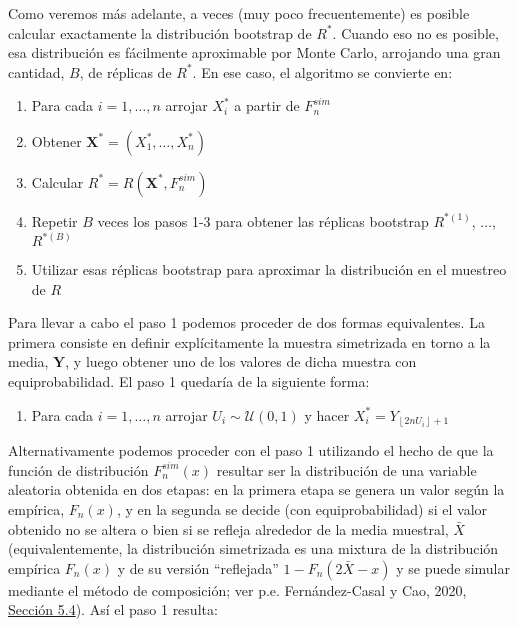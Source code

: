 \documentclass[
]{book}
\providecommand{\tightlist}{%
  \setlength{\itemsep}{0pt}\setlength{\parskip}{0pt}}
\theoremstyle{break}
\theoremstyle{definition}
\theoremstyle{definition}
\theoremstyle{definition}
\theoremstyle{remark}
\begin{document}
Como veremos más adelante, a veces (muy poco frecuentemente) es posible
calcular exactamente la distribución bootstrap de \(R^{\ast}\). Cuando
eso no es posible, esa distribución es fácilmente aproximable por Monte
Carlo, arrojando una gran cantidad, \(B\), de réplicas de \(R^{\ast}\). En
ese caso, el algoritmo se convierte en:

\begin{enumerate}
\def\labelenumi{\arabic{enumi}.}
\item
  Para cada \(i=1,\ldots ,n\) arrojar \(X_i^{\ast}\) a partir de
  \(F_n^{sim}\)
\item
  Obtener \(\mathbf{X}^{\ast}=\left( X_1^{\ast},\ldots ,X_n^{\ast} \right)\)
\item
  Calcular
  \(R^{\ast}=R\left( \mathbf{X}^{\ast},F_n^{sim} \right)\)
\item
  Repetir \(B\) veces los pasos 1-3 para obtener las réplicas bootstrap
  \(R^{\ast (1)}\), \(\ldots\), \(R^{\ast (B)}\)
\item
  Utilizar esas réplicas bootstrap para aproximar la distribución en el
  muestreo de \(R\)
\end{enumerate}

Para llevar a cabo el paso 1 podemos proceder de dos formas
equivalentes. La primera consiste en definir explícitamente la muestra
simetrizada en torno a la media, \(\mathbf{Y}\), y luego obtener
uno de los valores de dicha muestra con equiprobabilidad. El paso 1
quedaría de la siguiente forma:

\begin{enumerate}
\def\labelenumi{\arabic{enumi}.}
\tightlist
\item
  Para cada \(i=1,\ldots ,n\) arrojar \(U_i\sim \mathcal{U}\left( 0,1 \right)\) y
  hacer \(X_i^{\ast}=Y_{\left\lfloor 2nU_i\right\rfloor +1}\)
\end{enumerate}

Alternativamente podemos proceder con el paso 1 utilizando el hecho de que la función de distribución \(F_n^{sim}\left( x \right)\) resultar ser la distribución de una variable aleatoria obtenida en dos etapas:
en la primera etapa se genera un valor según la empírica, \(F_n\left( x \right)\), y en la segunda se decide (con equiprobabilidad) si el valor obtenido no se altera o bien si se refleja alrededor de la media muestral, \(\bar{X}\)
(equivalentemente, la distribución simetrizada es una mixtura de la distribución empírica \(F_n\left( x \right)\) y de su versión ``reflejada'' \(1-F_n\left( 2\bar{X}-x \right)\) y se puede simular mediante el método de composición; ver p.e. Fernández-Casal y Cao, 2020, \href{https://rubenfcasal.github.io/simbook/m\%C3\%A9todo-de-composici\%C3\%B3n.html}{Sección 5.4}). Así el paso 1 resulta:
\end{document}
